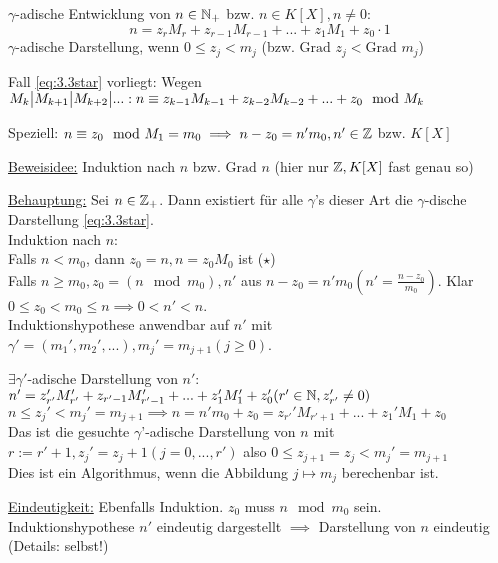 \documentclass[a4paper,DIV15,BCOR12mm]{article}
\begin{document}
$\gamma$-adische Entwicklung von $n \in \mathbb{N}_+$ bzw. $n \in K[X], n \not= 0:$
\begin{equation}\label{eq:3.3star}
     n = z_rM_r + z_{r-1}M_{r-1} + ... + z_1M_1 + z_0 \cdot 1
\end{equation}
$\gamma$-adische Darstellung, wenn $0 \le z_j < m_j$ (bzw.
$\text{Grad }z_j < \text{Grad }m_j$)

\begin{beweis}[Ziffernsatz]
Fall \eqref{eq:3.3star} vorliegt: Wegen $M_k \big| M_{k+1} \big| M_{k+2} \big| ...: \\
n \equiv z_{k-1}M_{k-1} + z_{k-2}M_{k-2} + ... + z_0 \mod M_k$

Speziell: $n \equiv z_0 \mod M_1 = m_0 \implies n-z_0 = n'm_0, n'
\in \mathbb{Z}$ bzw. $K[X]$

\underline{Beweisidee:} Induktion nach $n$ bzw. $\text{Grad }n$
(hier nur $\mathbb{Z}, K[X]$ fast genau so)

\underline{Behauptung:} Sei $n \in \mathbb{Z}_+$. Dann existiert für alle $\gamma$'s dieser Art die $\gamma$-dische Darstellung \eqref{eq:3.3star}.\\
Induktion nach $n$:\\
Falls $n < m_0$, dann $z_0 = n, n = z_0M_0$ ist ($\star$)\\
Falls $n \ge m_0, z_0 = (n \mod m_0), n'$ aus $n - z_0 = n'm_0 (n' = \frac{n-z_0}{m_0})$. Klar $0 \le z_0 < m_0 \le n \implies 0 < n' < n$.\\
Induktionshypothese anwendbar auf $n'$ mit $\gamma' = (m_1', m_2',
...), m_j' = m_{j+1} (j \ge 0)$.

$\exists \gamma'$-adische Darstellung von $n'$:\\
$n' = z_{r'}'M_{r'}' + z_{r'-1}M_{r'-1}' + ... + z_1'M_1' + z_0' (r' \in \mathbb{N}, z_{r'}' \not= 0)$\\
$n \le z_j' < m_j' = m_{j+1} \implies n = n'm_0 + z_0 = z_{r'}'M_{r'+1} + ... + z_1'M_1 + z_0$\\
Das ist die gesuchte $\gamma$'-adische Darstellung von $n$ mit $r := r' + 1, z_j' = z_j + 1 (j = 0, ..., r')$ also $0 \le z_{j+1} = z_j < m_j' = m_{j+1}$\\
Dies ist ein Algorithmus, wenn die Abbildung $j \mapsto m_j$
berechenbar ist.

\underline{Eindeutigkeit:} Ebenfalls Induktion. $z_0$ muss $n \mod
m_0$ sein. Induktionshypothese $n'$ eindeutig dargestellt $\implies$
Darstellung von $n$ eindeutig (Details: selbst!)
\end{beweis}
\end{document}
